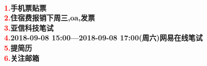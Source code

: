 \documentclass{article}
\begin{document}
\begin{CJK}{UTF8}{gkai}
\end{CJK}
\begin{CJK}{UTF8}{gbsn}
\textcolor[rgb]{1,0,0}{\begin{math} \end{math} \begin{math}			\end{math}}



\fontsize{2.5em}{2.5ex}\selectfont
\begin{center}
\textbf{
	\textcolor{red}{1.}手机票贴票\\
	\textcolor{red}{2.}住宿费报销下周三,oa,发票\\
	\textcolor{red}{3.}亚信科技笔试\\
	\textcolor{red}{4.}2018-09-08 15:00---2018-09-08 17:00(周六)网易在线笔试\\
	\textcolor{red}{5.}提简历\\
	\textcolor{red}{6.}关注邮箱\\
}
\end{center}
\end{CJK}
\end{document}
